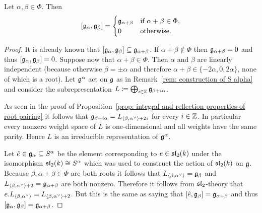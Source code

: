 \begin{cor}
 Let $\alpha, \beta \in \Phi$. Then
 \[
  [\mathfrak{g}_\alpha, \mathfrak{g}_\beta] =
  \begin{cases}
   \mathfrak{g}_{\alpha+\beta} & \text{if $\alpha+\beta \in \Phi$}, \\
   0                 & \text{otherwise}.
  \end{cases}
 \]
\end{cor}
\begin{proof}
 It is already known that $[\mathfrak{g}_\alpha, \mathfrak{g}_\beta] \subseteq \mathfrak{g}_{\alpha + \beta}$. If $\alpha+\beta \notin \Phi$ then $\mathfrak{g}_{\alpha + \beta} = 0$ and thus $[\mathfrak{g}_\alpha, \mathfrak{g}_\beta] = 0$. Suppose now that $\alpha + \beta \in \Phi$. Then $\alpha$ and $\beta$ are linearly independent (because otherwise $\beta = \pm \alpha$ and therefore $\alpha+\beta \in \{-2\alpha, 0, 2\alpha\}$, none of which is a root). Let $\mathfrak{g}^\alpha$ act on $\mathfrak{g}$ as in Remark~\ref{rem: construction of S alpha} and consider the subrepresentation $L \coloneqq \bigoplus_{i \in \mathbb{Z}} \mathfrak{g}_{\beta + i\alpha}$.
 
 As seen in the proof of Proposition~\ref{prop: integral and reflection properties of root pairing} it follows that $\mathfrak{g}_{\beta + i\alpha} = L_{\langle\beta, \alpha^\vee\rangle+2i}$ for every $i \in \mathbb{Z}$. In particular every nonzero weight space of $L$ is one-dimensional and all weights have the same parity. Hence $L$ is an irreducible representation of $\mathfrak{g}^\alpha$.
 
 Let $\hat{e} \in \mathfrak{g}_\alpha \subseteq S^\alpha$ be the element corresponding to $e \in \mathfrak{sl}_2(k)$ under the isomorphism $\mathfrak{sl}_2(k) \cong S^\alpha$ which was used to construct the action of $\mathfrak{sl}_2(k)$ on $\mathfrak{g}$. Because $\beta, \alpha + \beta \in \Phi$ are both roots it follows that $L_{\langle\beta, \alpha^\vee\rangle} = \mathfrak{g}_\beta$ and $L_{\langle\beta, \alpha^\vee\rangle+2} = \mathfrak{g}_{\alpha+\beta}$ are both nonzero. Therefore it follows from $\mathfrak{sl}_2$-theory that $e.L_{\langle\beta, \alpha^\vee\rangle} = L_{\langle\beta, \alpha^\vee\rangle+2}$. But this is the same as saying that $[\hat{e}, \mathfrak{g}_\beta] = \mathfrak{g}_{\alpha+\beta}$ and thus $[\mathfrak{g}_\alpha, \mathfrak{g}_\beta] = \mathfrak{g}_{\alpha+\beta}$.
\end{proof}



















